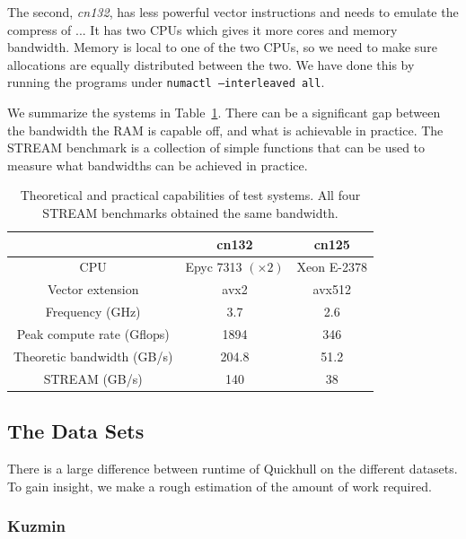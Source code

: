 The second, \textit{cn132}, has less powerful vector instructions and needs
to emulate the compress of ... It has two CPUs which gives it more cores
and memory bandwidth. Memory is local to one of the two CPUs, so we need
to make sure allocations are equally distributed between the two. We have
done this by running the programs under \texttt{numactl --interleaved all}.

We summarize the systems in Table~\ref{tab:system}. There can be a significant
gap between the bandwidth the RAM is capable off, and what is achievable in
practice. The STREAM benchmark \cite{} is a collection of simple functions
that can be used to measure what bandwidths can be achieved in practice.

\begin{table}
    \caption{Theoretical and practical capabilities of test systems. All four
             STREAM benchmarks obtained the same bandwidth.}
    \label{tab:system}
    \begin{tabular}{c|c|c}
                                   & cn132 & cn125          \\
        \hline                                              
        CPU                        & Epyc 7313 $(\times 2)$ 
                                           & Xeon E-2378    \\
        Vector extension           & avx2  & avx512         \\
        Frequency (GHz)            & 3.7   & 2.6            \\
        Peak compute rate (Gflops) & 1894  & 346            \\
        Theoretic bandwidth (GB/s) & 204.8 & 51.2           \\ 
        STREAM (GB/s)              & 140   & 38             \\ 
    \end{tabular}
\end{table}

\subsection{The Data Sets}\label{subsec:datasets}

There is a large difference between runtime of Quickhull on the different 
datasets.
To gain insight, we make a rough estimation of the amount of work required.

\subsubsection{Kuzmin}

